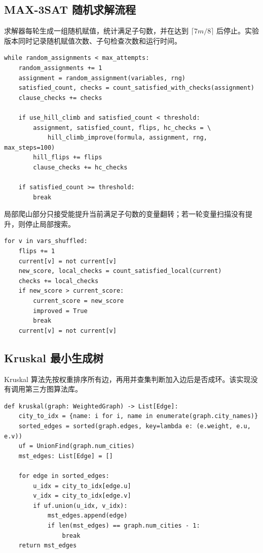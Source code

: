 \documentclass{sysucseexp}
\begin{document}
\subsection{MAX-3SAT 随机求解流程}

求解器每轮生成一组随机赋值，统计满足子句数，并在达到 $\lceil 7m/8\rceil$ 后停止。实验版本同时记录随机赋值次数、子句检查次数和运行时间。

{\small
\begin{verbatim}
while random_assignments < max_attempts:
    random_assignments += 1
    assignment = random_assignment(variables, rng)
    satisfied_count, checks = count_satisfied_with_checks(assignment)
    clause_checks += checks

    if use_hill_climb and satisfied_count < threshold:
        assignment, satisfied_count, flips, hc_checks = \
            hill_climb_improve(formula, assignment, rng, max_steps=100)
        hill_flips += flips
        clause_checks += hc_checks

    if satisfied_count >= threshold:
        break
\end{verbatim}
}

局部爬山部分只接受能提升当前满足子句数的变量翻转；若一轮变量扫描没有提升，则停止局部搜索。

{\small
\begin{verbatim}
for v in vars_shuffled:
    flips += 1
    current[v] = not current[v]
    new_score, local_checks = count_satisfied_local(current)
    checks += local_checks
    if new_score > current_score:
        current_score = new_score
        improved = True
        break
    current[v] = not current[v]
\end{verbatim}
}

\subsection{Kruskal 最小生成树}

Kruskal 算法先按权重排序所有边，再用并查集判断加入边后是否成环。该实现没有调用第三方图算法库。

{\small
\begin{verbatim}
def kruskal(graph: WeightedGraph) -> List[Edge]:
    city_to_idx = {name: i for i, name in enumerate(graph.city_names)}
    sorted_edges = sorted(graph.edges, key=lambda e: (e.weight, e.u, e.v))
    uf = UnionFind(graph.num_cities)
    mst_edges: List[Edge] = []

    for edge in sorted_edges:
        u_idx = city_to_idx[edge.u]
        v_idx = city_to_idx[edge.v]
        if uf.union(u_idx, v_idx):
            mst_edges.append(edge)
            if len(mst_edges) == graph.num_cities - 1:
                break
    return mst_edges
\end{verbatim}
}
\end{document}
